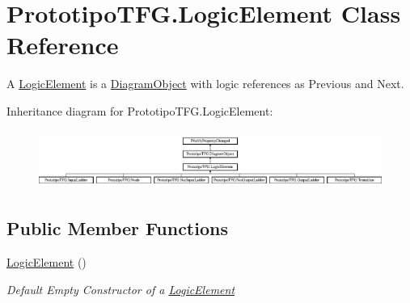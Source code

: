 \hypertarget{class_prototipo_t_f_g_1_1_logic_element}{}\section{Prototipo\+T\+F\+G.\+Logic\+Element Class Reference}
\label{class_prototipo_t_f_g_1_1_logic_element}


A \hyperlink{class_prototipo_t_f_g_1_1_logic_element}{Logic\+Element} is a \hyperlink{class_prototipo_t_f_g_1_1_diagram_object}{Diagram\+Object} with logic references as Previous and Next.  


Inheritance diagram for Prototipo\+T\+F\+G.\+Logic\+Element\+:\begin{figure}[H]
\begin{center}
\leavevmode
\includegraphics[height=1.924399cm]{class_prototipo_t_f_g_1_1_logic_element}
\end{center}
\end{figure}
\subsection*{Public Member Functions}
\begin{DoxyCompactItemize}
\item 
\hyperlink{class_prototipo_t_f_g_1_1_logic_element_a772ea32462de0fb3ba98057c40287b00}{Logic\+Element} ()
\begin{DoxyCompactList}\small\item\em Default Empty Constructor of a \hyperlink{class_prototipo_t_f_g_1_1_logic_element}{Logic\+Element} \end{DoxyCompactList}\end{DoxyCompactItemize}
